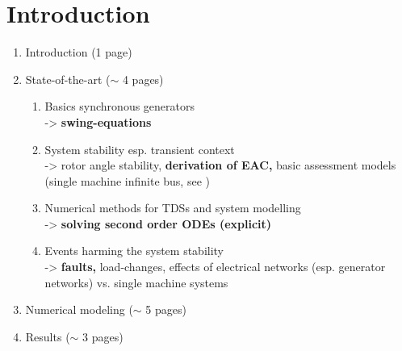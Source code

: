 
\chapter{Introduction}
\label{chap:intro}


\begin{enumerate}\bfseries \singlespacing \small
    \renewcommand{\labelenumi}{\theenumi}
    \renewcommand{\theenumi}{\arabic{enumi}}
    \renewcommand{\labelenumii}{\theenumii}
    \renewcommand{\theenumii}{\theenumi.\arabic{enumii}}
    \setlength{\leftmarginii}{5.4ex}
    \item Introduction (1 page)
    \item State-of-the-art ($\sim$ 4 pages)
    \begin{enumerate} \mdseries
        \item Basics synchronous generators \\
        -> \textbf{swing-equations}
        \item System stability esp. transient context \\
        -> rotor angle stability, \textbf{derivation of EAC,} basic assessment models (single machine infinite bus, see \autocite{kundurPowerSystemStability2022})
        \item Numerical methods for \acsp{TDS} and system modelling \\
        -> \textbf{solving second order ODEs (explicit)}
        \item Events harming the system stability \\
        -> \textbf{faults,} load-changes, effects of electrical networks (esp. generator networks) vs. single machine systems
    \end{enumerate}
    \item Numerical modeling ($\sim$ 5 pages)
    \item Results ($\sim$ 3 pages)
    \begin{enumerate} \mdseries

\end{enumerate}
\end{enumerate}
